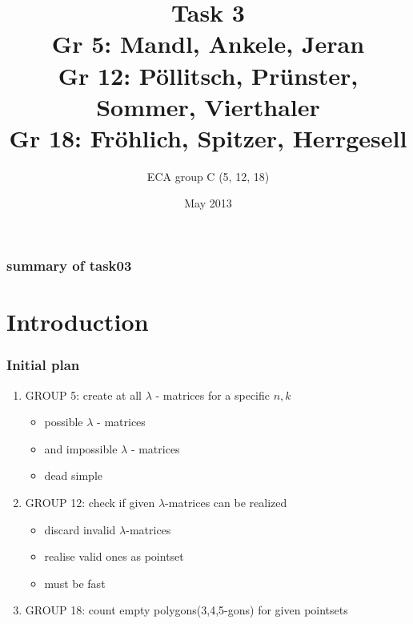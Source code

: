 \documentclass{beamer}
\title{Task 3 \\ \small{Gr 5: Mandl, Ankele, Jeran\\Gr 12: P\"ollitsch, Pr\"unster, Sommer, Vierthaler\\Gr 18: Fr\"ohlich, Spitzer, Herrgesell}}
\author{ECA group C (5, 12, 18)}
\date{May 2013}
\begin{document}
\begin{frame}[plain]
	\titlepage
\end{frame}

\begin{frame}
\frametitle{summary of task03}
\end{frame}

\section{Introduction}
\begin{frame}
\frametitle{Initial plan}
\begin{enumerate}
\item GROUP 5: create at all  $\lambda$ - matrices for a specific $n,k$
  \begin{itemize}
  \item possible $\lambda$ - matrices
  \item and impossible $\lambda$ - matrices
  \item dead simple
  \end{itemize}
\item GROUP 12: check if given $\lambda$-matrices can be realized
  \begin{itemize}
  \item discard invalid $\lambda$-matrices
  \item realise valid ones as pointset
  \item must be fast
  \end{itemize}
\item GROUP 18: count empty polygons(3,4,5-gons) for given pointsets
\end{enumerate}
\end{frame}

\end{document}
